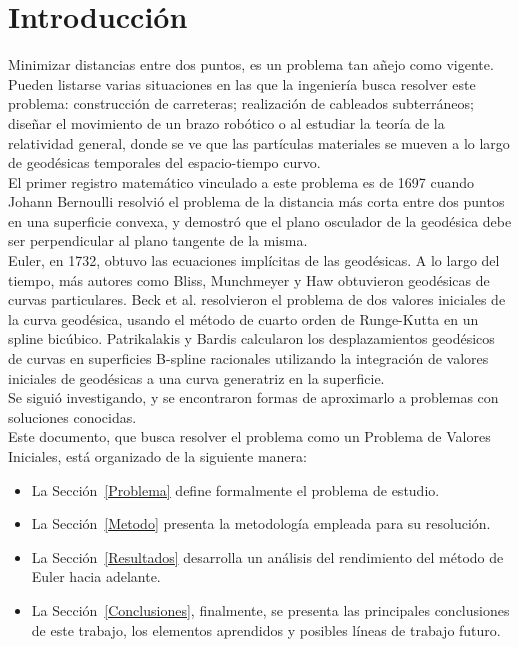\documentclass{endm}
\begin{document}
\tableofcontents
\clearpage
%
\section{Introducci\'on}\label{intro}
\tab Minimizar distancias entre dos puntos, es un problema tan añejo como vigente. Pueden listarse varias situaciones en las que la ingenier\'ia busca resolver este problema: construcci\'on de carreteras; realizaci\'on de cableados subterr\'aneos; diseñar el movimiento de un brazo rob\'otico o al estudiar la teor\'ia de la relatividad general, donde se ve que las part\'iculas materiales se mueven a lo largo de geod\'esicas temporales del espacio-tiempo curvo. \\

El primer registro matem\'atico vinculado a este problema es de 1697 cuando Johann Bernoulli resolvi\'o  el problema de la distancia m\'as corta entre dos puntos en una superficie convexa, y demostr\'o que el plano osculador de la geod\'esica debe ser perpendicular al plano tangente de la misma. \\

Euler, en 1732, obtuvo las ecuaciones impl\'icitas de las geod\'esicas. 
A lo largo del tiempo, m\'as autores como Bliss, Munchmeyer y Haw obtuvieron geod\'esicas de curvas particulares. Beck et al. resolvieron el problema de dos valores iniciales de la curva geod\'esica, usando el m\'etodo de cuarto orden de Runge-Kutta en un spline bic\'ubico. Patrikalakis y Bardis calcularon los desplazamientos geod\'esicos de curvas en superficies B-spline racionales utilizando la integraci\'on de valores iniciales de geod\'esicas a una curva generatriz  en la superficie.\\

Se sigui\'o investigando, y se encontraron formas de aproximarlo a problemas con soluciones conocidas.\\ 

Este documento, que busca resolver el problema como un Problema de Valores Iniciales,  est\'a organizado de la siguiente manera:
\begin{itemize}
\item La Secci\'on~\ref{Problema} define formalmente el problema de estudio.
\item La Secci\'on~\ref{Metodo} presenta la metodolog\'ia empleada para su resoluci\'on.
\item La Secci\'on~\ref{Resultados} desarrolla un an\'alisis del rendimiento del m\'etodo de Euler hacia adelante.
\item La Secci\'on~\ref{Conclusiones}, finalmente, se presenta las principales conclusiones de este trabajo, los elementos aprendidos y posibles l\'ineas de trabajo futuro.
\end{itemize}
\end{document}
